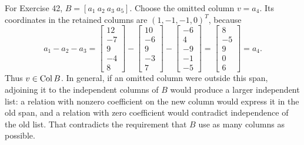 For Exercise 42, $B=[a_1\ a_2\ a_3\ a_5]$. Choose the omitted
column $v=a_4$. Its coordinates in the retained columns are
$(1,-1,-1,0)^T$, because
\[
 a_1-a_2-a_3=
 \begin{bmatrix}12\\-7\\9\\-4\\8\end{bmatrix}
 -\begin{bmatrix}10\\-6\\9\\-3\\7\end{bmatrix}
 -\begin{bmatrix}-6\\4\\-9\\-1\\-5\end{bmatrix}
 =\begin{bmatrix}8\\-5\\9\\0\\6\end{bmatrix}=a_4.
\]
Thus $v\in\operatorname{Col} B$. In general, if an omitted column were outside
this span, adjoining it to the independent columns of $B$ would
produce a larger independent list: a relation with nonzero coefficient
on the new column would express it in the old span, and a relation
with zero coefficient would contradict independence of the old list.
That contradicts the requirement that $B$ use as many columns as possible.
